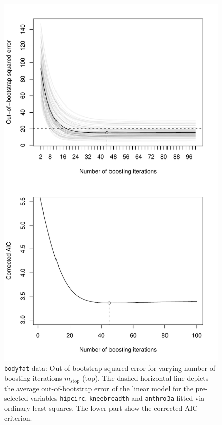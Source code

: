 \documentclass{article}
\newcommand{\Robject}[1]{\texttt{#1}}
\begin{document}
\begin{figure}
\begin{center}
\includegraphics{figures/bodyfat_glmboost-bodyfat-oob-plot.pdf}
\caption{\Robject{bodyfat} data: Out-of-bootstrap squared error for varying
  number of  
         boosting iterations $m_\text{stop}$ (top). The dashed horizontal line
         depicts the average out-of-bootstrap error of the linear model 
         for the pre-selected variables \Robject{hipcirc},
         \Robject{kneebreadth}  
         and \Robject{anthro3a} fitted via ordinary least squares. 
         The lower part show the corrected AIC criterion.
         \label{bodyfat-oob-plot}}
\end{center}
\end{figure}
\end{document}
